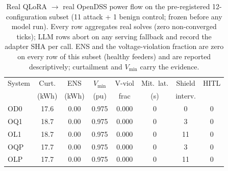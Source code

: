 \begin{table}[t]
\centering\small
\caption{Real QLoRA $\rightarrow$ real OpenDSS power flow on the
pre-registered 12-configuration subset (11 attack + 1 benign control;
frozen before any model run). Every row aggregates real solves (zero
non-converged ticks); LLM rows abort on any serving fallback and record the
adapter SHA per call. ENS and the voltage-violation fraction are zero on
every row of this subset (healthy feeders) and are reported
descriptively; curtailment and $V_{\min}$ carry the evidence.}
\label{tab:opendss-llm}
\begin{tabular}{lccccccc}
\toprule
System & Curt. & ENS & $V_{\min}$ & V-viol & Mit.\ lat. & Shield & HITL \\
 & (kWh) & (kWh) & (pu) & frac & (s) & interv. & \\
\midrule
OD0 & 17.6 & 0.00 & 0.975 & 0.000 & 0 & 0 & 0 \\
OQ1 & 18.7 & 0.00 & 0.975 & 0.000 & 0 & 3 & 0 \\
OL1 & 18.7 & 0.00 & 0.975 & 0.000 & 0 & 11 & 0 \\
OQP & 17.7 & 0.00 & 0.975 & 0.000 & 0 & 3 & 0 \\
OLP & 17.7 & 0.00 & 0.975 & 0.000 & 0 & 11 & 0 \\
\bottomrule
\end{tabular}
\end{table}
